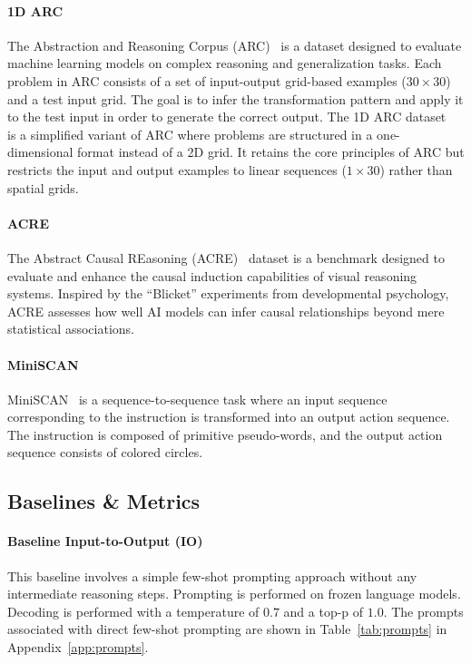 \paragraph{1D ARC} The Abstraction and Reasoning Corpus (ARC)~\citep{chollet2019measureintelligence} is a dataset designed to evaluate machine learning models on complex reasoning and generalization tasks. Each problem in ARC consists of a set of input-output grid-based examples ($30\times30$) and a test input grid. The goal is to infer the transformation pattern and apply it to the test input in order to generate the correct output. The 1D ARC dataset~\citep{xu2024llmsabstractionreasoningcorpus} is a simplified variant of ARC where problems are structured in a one-dimensional format instead of a 2D grid. It retains the core principles of ARC but restricts the input and output examples to linear sequences ($1\times30$) rather than spatial grids.

\paragraph{ACRE} The Abstract Causal REasoning (ACRE)~\citep{zhang2021acreabstractcausalreasoning} dataset is a benchmark designed to evaluate and enhance the causal induction capabilities of visual reasoning systems. Inspired by the ``Blicket'' experiments from developmental psychology, ACRE assesses how well AI models can infer causal relationships beyond mere statistical associations.

\paragraph{MiniSCAN} MiniSCAN~\citep{lake2019humanfewshotlearningcompositional} is a sequence-to-sequence task where an input sequence corresponding to the instruction is transformed into an output action sequence. The instruction is composed of primitive pseudo-words, and the output action sequence consists of colored circles.

\subsection{Baselines \& Metrics}

\paragraph{Baseline Input-to-Output (IO)} This baseline involves a simple few-shot prompting approach without any intermediate reasoning steps. Prompting is performed on frozen language models. Decoding is performed with a temperature of $0.7$ and a top-p of $1.0$. The prompts associated with direct few-shot prompting are shown in Table~\ref{tab:prompts} in Appendix~\ref{app:prompts}. 

